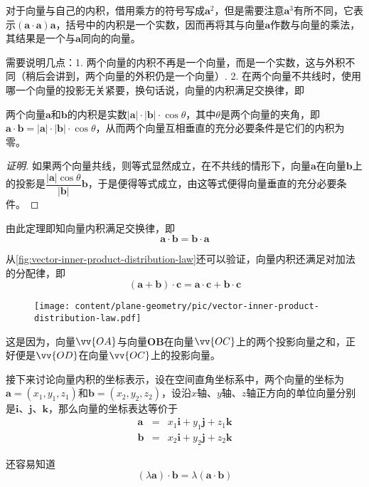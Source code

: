 对于向量与自己的内积，借用乘方的符号写成$\bm{a}^2$，但是需要注意$\bm{a}^3$有所不同，它表示$(\bm{a} \cdot \bm{a})\bm{a}$，括号中的内积是一个实数，因而再将其与向量$\bm{a}$作数与向量的乘法，其结果是一个与$\bm{a}$同向的向量。

需要说明几点：1. 两个向量的内积不再是一个向量，而是一个实数，这与外积不同（稍后会讲到，两个向量的外积仍是一个向量）. 2. 在两个向量不共线时，使用哪一个向量的投影无关紧要，换句话说，向量的内积满足交换律，即
\begin{theorem}
两个向量$\bm{a}$和$\bm{b}$的内积是实数$|\bm{a}| \cdot |\bm{b}| \cdot \cos{\theta}$，其中$\theta$是两个向量的夹角，即$\bm{a} \cdot \bm{b} = |\bm{a}| \cdot |\bm{b}| \cdot \cos{\theta}$，从而两个向量互相垂直的充分必要条件是它们的内积为零。
\end{theorem}

\begin{proof}[证明]
  如果两个向量共线，则等式显然成立，在不共线的情形下，向量$\bm{a}$在向量$\bm{b}$上的投影是$\dfrac{|\bm{a}|\cos{\theta}}{|\bm{b}|} \bm{b}$，于是便得等式成立，由这等式便得向量垂直的充分必要条件。
\end{proof}

由此定理即知向量内积满足交换律，即
\[ \bm{a} \cdot \bm{b} = \bm{b} \cdot \bm{a} \]

从\autoref{fig:vector-inner-product-distribution-law}还可以验证，向量内积还满足对加法的分配律，即
\[ (\bm{a}+\bm{b}) \cdot \bm{c} = \bm{a} \cdot \bm{c} + \bm{b} \cdot \bm{c} \] 

\begin{figure}[htbp]
\centering
\texttt{[image: content/plane-geometry/pic/vector-inner-product-distribution-law.pdf]}
\caption{}
\label{fig:vector-inner-product-distribution-law}
\end{figure}

这是因为，向量$\vv{OA}$与向量$\bm{OB}$在向量$\vv{OC}$上的两个投影向量之和，正好便是$\vv{OD}$在向量$\vv{OC}$上的投影向量。

接下来讨论向量内积的坐标表示，设在空间直角坐标系中，两个向量的坐标为$\bm{a} = (x_1,y_1,z_1)$和$\bm{b}=(x_2,y_2,z_2)$，设沿$x$轴、$y$轴、$z$轴正方向的单位向量分别是$\bm{i}$、$\bm{j}$、$\bm{k}$，那么向量的坐标表达等价于
\begin{eqnarray*}
  \bm{a} & = & x_1 \bm{i} + y_1 \bm{j} + z_1 \bm{k} \\
  \bm{b} & = & x_2 \bm{i} + y_2 \bm{j} + z_2 \bm{k}
\end{eqnarray*}

还容易知道
\[ (\lambda \bm{a}) \cdot \bm{b} = \lambda (\bm{a} \cdot \bm{b}) \]


